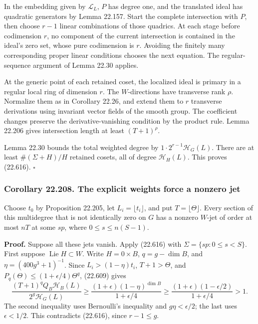 \documentclass[
  11pt,
  a4paper,
]{article}
\begin{document}
In the embedding given by \(\mathcal L_L\), \(P\) has degree one, and
the translated ideal has quadratic generators by Lemma 22.157. Start the
complete intersection with \(P\), then choose \(r-1\) linear
combinations of those quadrics. At each stage before codimension \(r\),
no component of the current intersection is contained in the ideal's
zero set, whose pure codimension is \(r\). Avoiding the finitely many
corresponding proper linear conditions chooses the next equation. The
regular-sequence argument of Lemma 22.30 applies.

At the generic point of each retained coset, the localized ideal is
primary in a regular local ring of dimension \(r\). The \(W\)-directions
have transverse rank \(\rho\). Normalize them as in Corollary 22.26, and
extend them to \(r\) transverse derivations using invariant vector
fields of the smooth group. The coefficient changes preserve the
derivative-vanishing condition by the product rule. Lemma 22.206 gives
intersection length at least \((T+1)^\rho\).

Lemma 22.30 bounds the total weighted degree by
\(1\cdot2^{r-1}\mathcal H_G(L)\). There are at least \(\#(\Sigma+H)/H\)
retained cosets, all of degree \(\mathcal H_H(L)\). This proves
(22.616). \(\square\)

\subsubsection{Corollary 22.208. The explicit weights force a nonzero
jet}\label{corollary-22.208.-the-explicit-weights-force-a-nonzero-jet}

Choose \(t_0\) by Proposition 22.205, let \(L_i=\lfloor t_i\rfloor\),
and put \(T=\lfloor\Theta\rfloor\). Every section of this multidegree
that is not identically zero on \(G\) has a nonzero \(W\)-jet of order
at most \(nT\) at some \(sp\), where \(0\le s\le n(S-1)\).

\textbf{Proof.} Suppose all these jets vanish. Apply (22.616) with
\(\Sigma=\{sp:0\le s<S\}\). First suppose
\(\operatorname{Lie}H\subset W\). Write \(H=0\times B\), \(q=g-\dim B\),
and \(\eta=(400g^3+1)^{-1}\). Since \(L_i>(1-\eta)t_i\), \(T+1>\Theta\),
and \(P_q(\Theta)\le(1+\epsilon/4)\Theta^q\), (22.609) gives \[
 \frac{(T+1)^qQ_B\mathcal H_B(L)}{2^g\mathcal H_G(L)}
 \ge\frac{(1+\epsilon)(1-\eta)^{\dim B}}
                 {1+\epsilon/4}
 \ge\frac{(1+\epsilon)(1-\epsilon/2)}{1+\epsilon/4}>1.
 \tag{22.617}
\] The second inequality uses Bernoulli's inequality and
\(g\eta<\epsilon/2\); the last uses \(\epsilon<1/2\). This contradicts
(22.616), since \(r-1\le g\).
\end{document}
